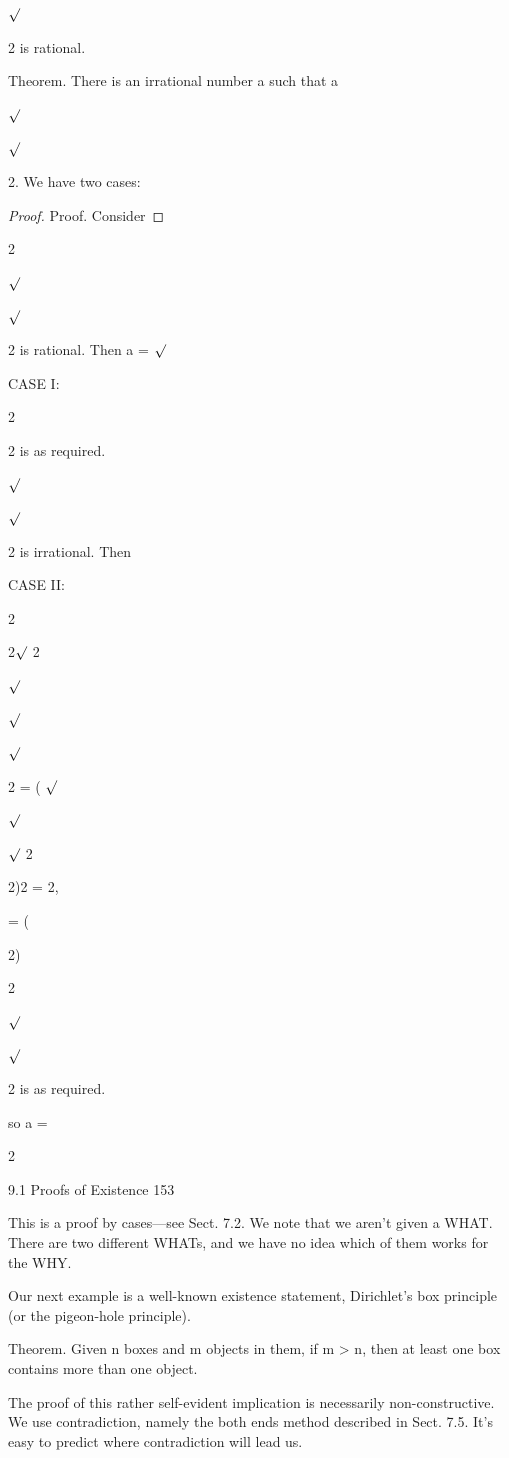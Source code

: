 \documentclass[11pt]{article}
\theoremstyle{plain}
\theoremstyle{definition}
\begin{document}
$\surd$

2 is rational.

Theorem. There is an irrational number a such that a

$\surd$

$\surd$

2. We have two cases:

\begin{proof}
Proof. Consider
\end{proof}

2

$\surd$

$\surd$

2 is rational. Then a = $\surd$

CASE I:

2

2 is as required.

$\surd$

$\surd$

2 is irrational. Then

CASE II:

2

2$\surd$ 2

$\surd$

$\surd$

$\surd$

2 = ( $\surd$

$\surd$

$\surd$ 2

2)2 = 2,

= (

2)

2

$\surd$

$\surd$

2 is as required. 

so a =

2

9.1 Proofs of Existence 153

This is a proof by cases---see Sect. 7.2. We note that we aren't given a WHAT. There are two different WHATs, and we have no idea which of them works for the WHY.

Our next example is a well-known existence statement, Dirichlet's box principle (or the pigeon-hole principle).

Theorem. Given n boxes and m objects in them, if m > n, then at least one box contains more than one object.

The proof of this rather self-evident implication is necessarily non-constructive. We use contradiction, namely the both ends method described in Sect. 7.5. It's easy to predict where contradiction will lead us.
\end{document}
